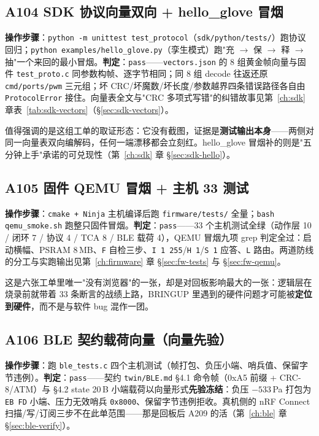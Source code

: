 \subsection{A104 SDK 协议向量双向 + hello\_glove 冒烟}
\textbf{操作步骤}：\texttt{python -m unittest test\_protocol}（\texttt{sdk/python/tests/}）跑协议回归；\texttt{python examples/hello\_glove.py}（孪生模式）跑"充 $\to$ 保 $\to$ 释 $\to$ 抽"一个来回的最小冒烟。\textbf{判定}：\texttt{pass}——\texttt{vectors.json} 的 8 组黄金帧向量与固件 \texttt{test\_proto.c} 同参数构帧、逐字节相同；同 8 组 decode 往返还原 \texttt{cmd/ports/pwm} 三元组；坏 CRC/坏魔数/坏长度/参数越界四条错误路径各自由 \texttt{ProtocolError} 接住。向量表全文与"CRC 多项式写错"的纠错故事见第~\ref{ch:sdk} 章表~\ref{tab:sdk-vectors}（\S\ref{sec:sdk-vectors}）。

值得强调的是这组工单的取证形态：它没有截图，证据是\textbf{测试输出本身}——两侧对同一向量表双向编解码，任何一端漂移都会立刻红。hello\_glove 冒烟补的则是"五分钟上手"承诺的可兑现性（第~\ref{ch:sdk} 章 \S\ref{sec:sdk-hello}）。

\subsection{A105 固件 QEMU 冒烟 + 主机 33 测试}
\textbf{操作步骤}：\texttt{cmake + Ninja} 主机编译后跑 \texttt{firmware/tests/} 全量；\texttt{bash qemu\_smoke.sh} 跑整只固件冒烟。\textbf{判定}：\texttt{pass}——33 个主机测试全绿（动作层 10 / 闭环 7 / 协议 4 / TCA 8 / BLE 载荷 4），QEMU 冒烟九项 grep 判定全过：启动横幅、PSRAM 8\,MB、\texttt{F} 自检三步、\texttt{I 1 255}/\texttt{H 1}/\texttt{S 1} 应答、\texttt{L} 路由。两道防线的分工与实跑输出见第~\ref{ch:firmware} 章 \S\ref{sec:fw-tests} 与 \S\ref{sec:fw-qemu}。

这是六张工单里唯一"没有浏览器"的一张，却是对回板影响最大的一张：逻辑层在烧录前就带着 33 条断言的战绩上路，BRINGUP 里遇到的硬件问题才可能被\textbf{定位到硬件}，而不是与软件 bug 混作一团。

\subsection{A106 BLE 契约载荷向量（向量先验）}
\textbf{操作步骤}：跑 \texttt{ble\_tests.c} 四个主机测试（帧打包、负压小端、哨兵值、保留字节违例）。\textbf{判定}：\texttt{pass}——契约 \texttt{twin/BLE.md} \S 4.1 命令帧（0xA5 前缀 + CRC-8/ATM）与 \S 4.2 state 20\,B 小端载荷以向量形式\textbf{先验冻结}：负压 $-533$\,Pa 打包为 \texttt{EB FD} 小端、压力无效哨兵 \texttt{0x8000}、保留字节违例拒收。真机侧的 nRF Connect 扫描/写/订阅三步不在此单范围——那是回板后 A209 的活（第~\ref{ch:ble} 章 \S\ref{sec:ble-verify}）。

